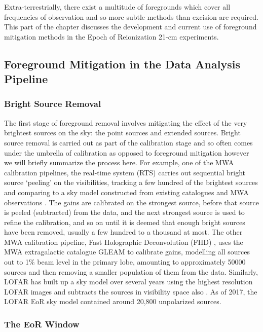 Extra-terrestrially, there exist a multitude of foregrounds which cover all frequencies of observation and so more subtle methods than excision are required. This part of the chapter discusses the development and current use of foreground mitigation methods in the Epoch of Reionization 21-cm experiments.

\subsection{Foreground Mitigation in the Data Analysis Pipeline}
\subsubsection{Bright Source Removal}
The first stage of foreground removal involves mitigating the effect of the very brightest sources on the sky: the point sources and extended sources. Bright source removal is carried out as part of the calibration stage and so often comes under the umbrella of calibration as opposed to foreground mitigation however we will briefly summarize the process here. For example, one of the MWA calibration pipelines, the real-time system (RTS) \citep{Mitchell2008ISTSP...2..707M} carries out sequential bright source `peeling' on the visibilities, tracking a few hundred of the brightest sources and comparing to a sky model constructed from existing catalogues and MWA observations \citet{Carroll2016MNRAS.461.4151C}. The gains are calibrated on the strongest source, before that source is peeled (subtracted) from the data, and the next strongest source is used to refine the calibration, and so on until it is deemed that enough bright sources have been removed, usually a few hundred to a thousand at most. The other MWA calibration pipeline, Fast Holographic Deconvolution (FHD) \citep{Sullivan2012ApJ...759...17S}, uses the MWA extragalactic catalogue GLEAM \citep{HW2017MNRAS.464.1146H} to calibrate gains, modelling all sources out to 1$\%$ beam level in the primary lobe, amounting to approximately 50000 sources \citep{Barry2019arXiv190102980B} and then removing a smaller population of them from the data. Similarly, LOFAR has built up a sky model over several years using the highest resolution LOFAR images and subtracts the sources in visibility space also \citet{Yata2015MNRAS.449.4506Y,Yata2013A&A...550A.136Y}. As of 2017, the LOFAR EoR sky model contained around 20,800 unpolarized sources. 

\subsubsection{The EoR Window}
\label{sec:wedge}

